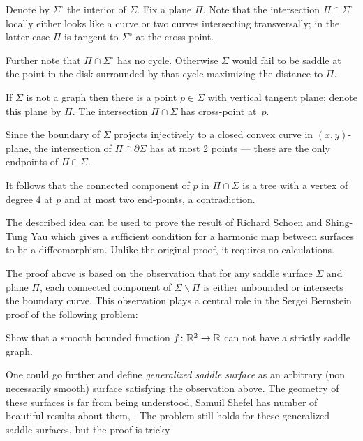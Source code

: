 Denote by $\Sigma^\circ$ the interior of $\Sigma$.
Fix a plane $\Pi$. 
Note that the intersection $\Pi\cap \Sigma^\circ$ 
locally either looks like a curve or two curves intersecting transversally;
in the latter case $\Pi$ is tangent to $\Sigma^\circ$ at the cross-point.

Further note that $\Pi\cap \Sigma^\circ$ has no cycle.
Otherwise $\Sigma$ would fail to be saddle at the point in the disk surrounded by that cycle maximizing the distance to $\Pi$.

If $\Sigma$ is not a graph then there is a point $p\in\Sigma$ with vertical tangent plane;
denote this plane by $\Pi$.
The intersection $\Pi\cap\Sigma$ has cross-point at~$p$.

Since the boundary of $\Sigma$ projects injectively to a closed convex curve in $(x,y)$-plane,
the intersection of $\Pi\cap\partial \Sigma$ has at most 2 points --- these are the only endpoints of $\Pi\cap\Sigma$.

It follows that the connected component of $p$ in $\Pi\cap\Sigma$ is a tree 
with a vertex of degree 4 at $p$ and at most two end-points, a contradiction.\qeds

The described idea can be used to prove the result of Richard Schoen and Shing-Tung  Yau \cite[see][]{schoen-yau-2D} which gives a sufficient condition for a harmonic map between surfaces to be a diffeomorphism.
Unlike the original proof, it requires no calculations.

The proof above is based on the observation 
that for any saddle surface $\Sigma$ and plane $\Pi$,
each connected component of $\Sigma\backslash \Pi$ is either unbounded or intersects the boundary curve.
This observation plays a central role in the Sergei Bernstein proof \cite[see][]{bernshtein}
of the following problem:

\begin{pr}
Show that a smooth bounded function $f\colon\mathbb{R}^2\to\mathbb{R}$ can not have a strictly saddle graph.
\end{pr}

One could go further and define \emph{generalized saddle surface} as an arbitrary (non necessarily smooth) surface satisfying the observation above.
The geometry of these surfaces is far from being understood,
Samuil Shefel has number of beautiful results about them, 
\cite[see][and the references there in]{shefel, AKP-invitation}.
The problem still holds for these generalized saddle surfaces, but
the proof is tricky \cite[see][]{petrunin-stadler}



